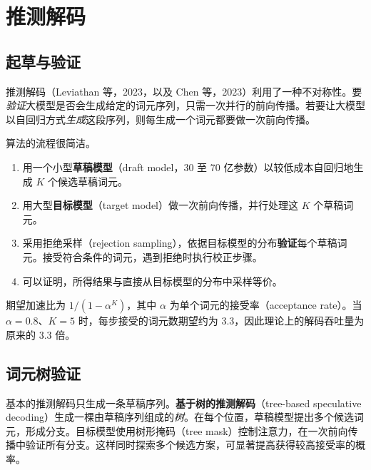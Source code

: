 \chapter{推测解码}

\section{起草与验证}

推测解码（Leviathan 等，2023，以及 Chen 等，2023）利用了一种不对称性。要\emph{验证}大模型是否会生成给定的词元序列，只需一次并行的前向传播。若要让大模型以自回归方式\emph{生成}这段序列，则每生成一个词元都要做一次前向传播。

算法的流程很简洁。
\begin{enumerate}
  \item 用一个小型\textbf{草稿模型}（draft model，30 至 70 亿参数）以较低成本自回归地生成 \(K\) 个候选草稿词元。
  \item 用大型\textbf{目标模型}（target model）做一次前向传播，并行处理这 \(K\) 个草稿词元。
  \item 采用拒绝采样（rejection sampling），依据目标模型的分布\textbf{验证}每个草稿词元。接受符合条件的词元，遇到拒绝时执行校正步骤。
  \item 可以证明，所得结果与直接从目标模型的分布中采样等价。
\end{enumerate}

期望加速比为 \(1/(1-\alpha^K)\)，其中 \(\alpha\) 为单个词元的接受率（acceptance rate）。当 \(\alpha=0.8\)、\(K=5\) 时，每步接受的词元数期望约为 \(3.3\)，因此理论上的解码吞吐量为原来的 \(3.3\) 倍。


\section{词元树验证}

基本的推测解码只生成一条草稿序列。\textbf{基于树的推测解码}（tree-based speculative decoding）生成一棵由草稿序列组成的\emph{树}。在每个位置，草稿模型提出多个候选词元，形成分支。目标模型使用树形掩码（tree mask）控制注意力，在一次前向传播中验证所有分支。这样同时探索多个候选方案，可显著提高获得较高接受率的概率。

